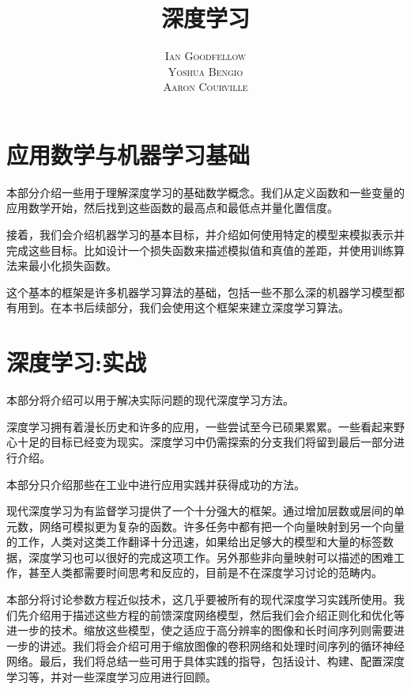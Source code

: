\documentclass[a4paper,11pt]{book}
\title{\Huge \textbf{深度学习} }
\author{\textsc{Ian Goodfellow} \\ \textsc{Yoshua Bengio} \\ \textsc{Aaron Courville}}
\numberwithin{equation}{chapter}
\begin{document}
\frontmatter
\maketitle


\tableofcontents
\listoffigures
\listoftables

\mainmatter





\part{应用数学与机器学习基础}
\label{part:1}

本部分介绍一些用于理解深度学习的基础数学概念。我们从定义函数和一些变量的应用数学开始，然后找到这些函数的最高点和最低点并量化置信度。


接着，我们会介绍机器学习的基本目标，并介绍如何使用特定的模型来模拟表示并完成这些目标。比如设计一个损失函数来描述模拟值和真值的差距，并使用训练算法来最小化损失函数。


这个基本的框架是许多机器学习算法的基础，包括一些不那么深的机器学习模型都有用到。在本书后续部分，我们会使用这个框架来建立深度学习算法。








\part{深度学习:实战}
\label{part:2}

本部分将介绍可以用于解决实际问题的现代深度学习方法。


深度学习拥有着漫长历史和许多的应用，一些尝试至今已硕果累累。一些看起来野心十足的目标已经变为现实。深度学习中仍需探索的分支我们将留到最后一部分进行介绍。


本部分只介绍那些在工业中进行应用实践并获得成功的方法。


现代深度学习为有监督学习提供了一个十分强大的框架。通过增加层数或层间的单元数，网络可模拟更为复杂的函数。许多任务中都有把一个向量映射到另一个向量的工作，人类对这类工作翻译十分迅速，如果给出足够大的模型和大量的标签数据，深度学习也可以很好的完成这项工作。另外那些非向量映射可以描述的困难工作，甚至人类都需要时间思考和反应的，目前是不在深度学习讨论的范畴内。


本部分将讨论参数方程近似技术，这几乎要被所有的现代深度学习实践所使用。我们先介绍用于描述这些方程的前馈深度网络模型，然后我们会介绍正则化和优化等进一步的技术。缩放这些模型，使之适应于高分辨率的图像和长时间序列则需要进一步的讲述。我们将会介绍可用于缩放图像的卷积网络和处理时间序列的循环神经网络。最后，我们将总结一些可用于具体实践的指导，包括设计、构建、配置深度学习等，并对一些深度学习应用进行回顾。
\end{document}
